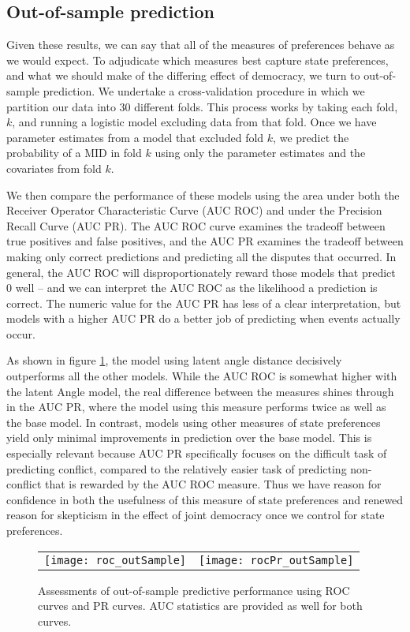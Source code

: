 \subsection*{Out-of-sample prediction}

Given these results, we can say that all of the measures of preferences behave as we would expect. To adjudicate which measures best capture state preferences, and what we should make of the differing effect of democracy, we turn to out-of-sample prediction. We undertake a cross-validation procedure in which we partition our data into 30 different folds. This process works by taking each fold, $k$, and running a logistic model excluding data from that fold. Once we have parameter estimates from a model that excluded fold $k$, we predict the probability of a MID in fold $k$ using only the parameter estimates and the covariates from fold $k$.

We then compare the performance of these models using the area under both the Receiver Operator Characteristic Curve (AUC ROC) and under the Precision Recall Curve (AUC PR). The AUC ROC curve examines the tradeoff between true positives and false positives, and the AUC PR examines the tradeoff between making only correct predictions and predicting all the disputes that occurred. In general, the AUC ROC will disproportionately reward those models that predict $0$ well -- and we can interpret the AUC ROC as the likelihood a prediction is correct. The numeric value for the AUC PR has less of a clear interpretation, but models with a higher AUC PR do a better job of predicting when events actually occur.

As shown in figure \ref{fig:roc}, the model using latent angle distance decisively outperforms all the other models. While the AUC ROC is somewhat higher with the latent Angle model, the real difference between the measures shines through in the AUC PR, where the model using this measure performs twice as well as the base model. In contrast, models using other measures of state preferences yield only minimal improvements in prediction over the base model. This is especially relevant because AUC PR specifically focuses on the difficult task of predicting conflict, compared to the relatively easier task of predicting non-conflict that is rewarded by the AUC ROC measure. Thus we have reason for confidence in both the usefulness of this measure of state preferences and renewed reason for skepticism in the effect of joint democracy once we control for state preferences. 

\begin{figure}[ht]
	\centering
	\begin{tabular}{cc}
	\texttt{[image: roc\_outSample]} & 
	\texttt{[image: rocPr\_outSample]}	
	\end{tabular}
	\caption{Assessments of out-of-sample predictive performance using ROC curves and PR curves. AUC statistics are provided as well for both curves.}
	\label{fig:roc}
\end{figure}
\FloatBarrier
